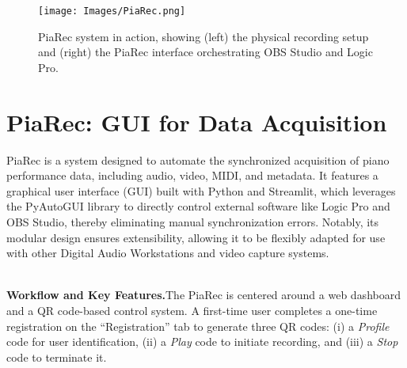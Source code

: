 \documentclass{article}
\begin{document}
\begin{figure}
    \centering
    \texttt{[image: Images/PiaRec.png]}
    \caption{PiaRec system in action, showing (left) the physical recording setup and (right) the PiaRec interface orchestrating OBS Studio and Logic Pro.}
    \vspace{-5mm}
    \label{fig:piarec}
\end{figure}

\section{PiaRec: GUI for Data Acquisition}


PiaRec is a system designed to automate the synchronized acquisition of piano performance data, including audio, video, MIDI, and metadata. It features a graphical user interface (GUI) built with Python and Streamlit, which leverages the PyAutoGUI library to directly control external software like Logic Pro and OBS Studio, thereby eliminating manual synchronization errors. Notably, its modular design ensures extensibility, allowing it to be flexibly adapted for use with other Digital Audio Workstations and video capture systems.

\vspace{1.25mm}\text{}\\
\textbf{Workflow and Key Features.}\quad The PiaRec is centered around a web dashboard and a QR code-based control system. A first-time user completes a one-time registration on the ``Registration'' tab to generate three QR codes: (i) a \emph{Profile} code for user identification, (ii) a \emph{Play} code to initiate recording, and (iii) a \emph{Stop} code to terminate it.
\end{document}
